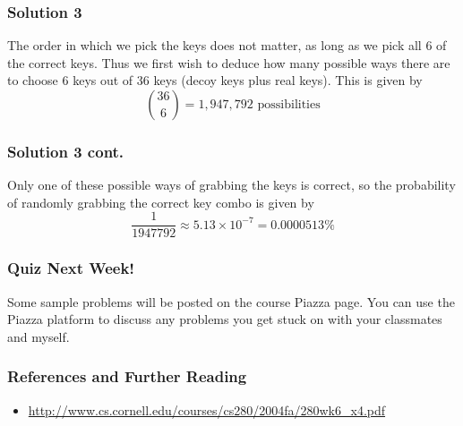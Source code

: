 \documentclass{beamer}
\newcommand{\<}{\langle}
\renewcommand{\>}{\rangle}
\begin{document}
\begin{frame}
\frametitle{Solution 3}

The order in which we pick the keys does not matter, as long as we pick all 6 of the correct keys. Thus we first wish to deduce how many possible ways there are to choose 6 keys out of 36 keys (decoy keys plus real keys). This is given by
\[
{36 \choose 6} = 1,947,792 \text{ possibilities}
\]
\end{frame}

\begin{frame}
\frametitle{Solution 3 cont.}

Only one of these possible ways of grabbing the keys is correct, so the probability of randomly grabbing the correct key combo is given by
\[
\frac{1}{1947792} \approx 5.13 \times 10^{-7} = 0.0000513 \%
\]
\end{frame}


\begin{frame}
\frametitle{Quiz Next Week!}

Some sample problems will be posted on the course Piazza page. You can use the Piazza platform to discuss any problems you get stuck on with your classmates and myself.
\end{frame}

\begin{frame}
\frametitle{References and Further Reading}

\begin{itemize}
\item \url{http://www.cs.cornell.edu/courses/cs280/2004fa/280wk6_x4.pdf}
\end{itemize}
\end{frame}
\end{document}
